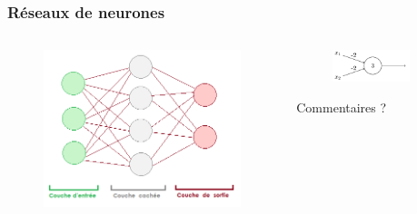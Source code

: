 \documentclass{beamer}
\begin{document}
\begin{frame}
    \frametitle{Réseaux de neurones}
    \begin{columns}[T]
        \begin{column}{.48\textwidth}
            \begin{figure}
                \includegraphics[width=\textwidth]{neuralnet.png}
            \end{figure}
        \end{column}
        \begin{column}{.48\textwidth}
            \begin{figure}
                \includegraphics[width=0.8\textwidth]{neuron.png}
            \end{figure}
            \begin{block}{}
                \center
                Commentaires ?
            \end{block}
        \end{column}
    \end{columns}
\end{frame}
\end{document}
